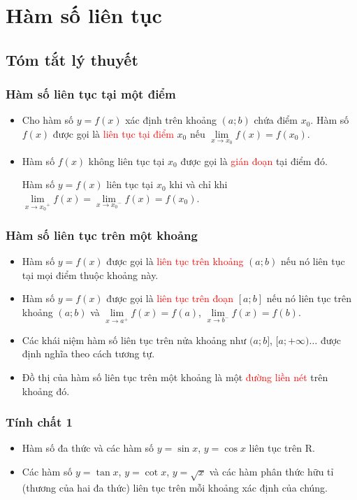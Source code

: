 \section{Hàm số liên tục}
\subsection{Tóm tắt lý thuyết}
\begin{tomtat}
	\subsubsection{Hàm số liên tục tại một điểm}
	\begin{itemize}
		\item Cho hàm số $y=f(x)$ xác định trên khoảng $(a;b)$ chứa điểm $x_0$. Hàm số $f(x)$ được gọi là \textcolor{red}{liên tục tại điểm} $x_0$ nếu $\lim\limits_{x\to{x_0}}f(x)=f(x_0)$.
		\item Hàm số $f(x)$ không liên tục tại $x_0$ được gọi là \textcolor{red}{gián đoạn} tại điểm đó.
		\begin{note}
			Hàm số $y=f(x)$ liên tục tại $x_0$ khi và chỉ khi $\lim\limits_{x\to{x_0}^+}f(x)=\lim\limits_{x\to{x_0}^-}f(x)=f(x_0)$.
		\end{note}
	\end{itemize}
	\subsubsection{Hàm số liên tục trên một khoảng}
	\begin{itemize}
		\item Hàm số $y=f(x)$ được gọi là \textcolor{red}{liên tục trên khoảng} $(a;b)$ nếu nó liên tục tại mọi điểm thuộc khoảng này.
		\item Hàm số $y=f(x)$ được gọi là \textcolor{red}{liên tục trên đoạn} $[a;b]$ nếu nó liên tục trên khoảng $(a;b)$ và $\lim\limits_{x\to{a}^+}f(x)=f(a)$, $\lim\limits_{x\to{b}^-}f(x)=f(b)$.
		\item Các khái niệm hàm số liên tục trên nửa khoảng như $(a;b]$, $[a;+\infty)\ldots$ được định nghĩa theo cách tương tự.
		\item Đồ thị của hàm số liên tục trên một khoảng là một \textcolor{red}{đường liền nét} trên khoảng đó.
	\end{itemize}
	\subsubsection{Tính chất 1}
	\begin{itemize}
		\item Hàm số đa thức và các hàm số $y=\sin x$, $y=\cos x$ liên tục trên $\mathrm{R}$.
		\item Các hàm số $y=\tan x$, $y=\cot x$, $y=\sqrt x$ và các hàm phân thức hữu tỉ (thương của hai đa thức) liên tục trên mỗi khoảng xác định của chúng.
	\end{itemize}

\end{tomtat}
